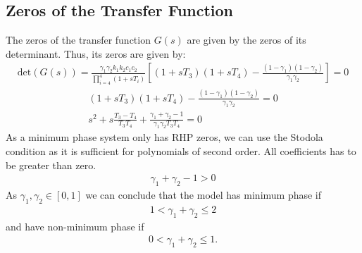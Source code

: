 \documentclass[a4paper,12pt,oneside,onecolumn]{article}
\begin{document}
\subsection{Zeros of the Transfer Function}
The zeros of the transfer function $G(s)$ are given by the zeros of its determinant. Thus, its zeros are given by:
\begin{align}
\textrm{det}( G(s)) = \frac{\gamma_1 \gamma_2 k_1 k_2 c_1 c_2}{\prod_{i=4}^4 (1+s T_i)} \left[(1+s T_3)(1+s T_4) - \frac{(1-\gamma_1)(1-\gamma_2)}{\gamma_1 \gamma_2}\right] = 0
\end{align}
\begin{align}
(1+sT_3)(1+sT_4) - \frac{(1-\gamma_1)(1-\gamma_2)}{\gamma_1 \gamma_2} = 0\\
s^2 + s \frac{T_3 - T_4}{T_3 T_4} + \frac{\gamma_1 + \gamma_2 - 1}{\gamma_1 \gamma_2 T_3 T_4} = 0
\end{align}
As a minimum phase system only has RHP zeros, we can use the Stodola condition as it is sufficient for polynomials of second order. All coefficients has to be greater than zero.
\begin{align}
    \gamma_1 + \gamma_2 - 1 > 0
\end{align}
As $\gamma_1, \gamma_2 \in [0,1]$ we can conclude that the model has minimum phase if 
\begin{align*}
    1 < \gamma_1 + \gamma_2 \leq 2
\end{align*}
and have non-minimum phase if
\begin{align*}
    0 < \gamma_1 + \gamma_2 \leq 1.
\end{align*}
\end{document}
